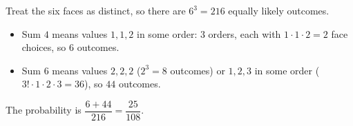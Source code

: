 Treat the six faces as distinct, so there are $6^3=216$ equally likely outcomes.
\begin{itemize}
\item Sum $4$ means values $1,1,2$ in some order: $3$ orders, each with $1\cdot1\cdot2=2$ face choices, so $6$ outcomes.
\item Sum $6$ means values $2,2,2$ ($2^3=8$ outcomes) or $1,2,3$ in some order ($3!\cdot1\cdot2\cdot3=36$), so $44$ outcomes.
\end{itemize}
The probability is $\dfrac{6+44}{216}=\boxed{\dfrac{25}{108}}$.
